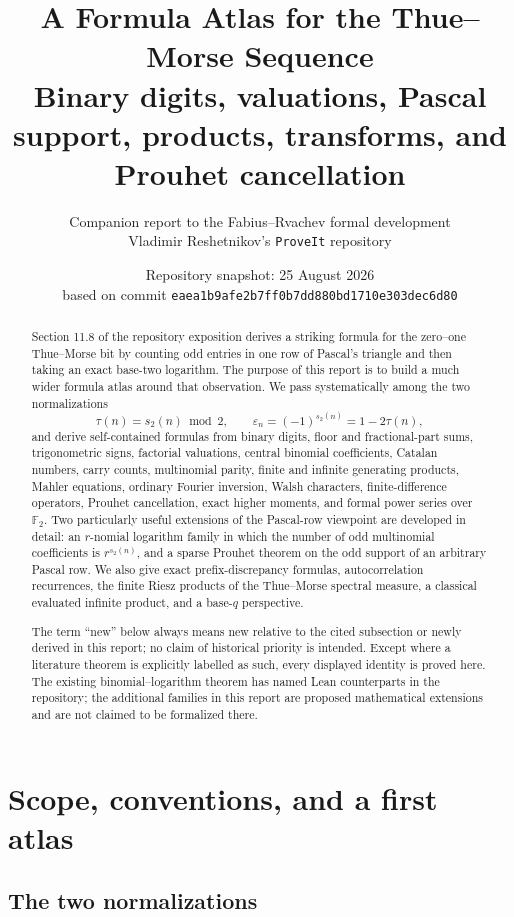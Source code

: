 \documentclass[11pt,oneside]{article}
\title{\bfseries A Formula Atlas for the Thue--Morse Sequence\\[0.35em]
\large Binary digits, valuations, Pascal support, products, transforms, and Prouhet cancellation}
\author{Companion report to the Fabius--Rvachev formal development\\
\small Vladimir Reshetnikov's \texttt{ProveIt} repository}
\date{Repository snapshot: 25 August 2026\\
\small based on commit \nolinkurl{eaea1b9afe2b7ff0b7dd880bd1710e303dec6d80}}
\theoremstyle{definition}
\theoremstyle{remark}
\newcommand{\F}{\mathbb F}
\newcommand{\swt}{s_2}
\newcommand{\eps}{\varepsilon}
\newcommand{\1}{\mathbf 1}
\begin{document}
\maketitle

\begin{abstract}
Section 11.8 of the repository exposition derives a striking formula for the zero--one
Thue--Morse bit by counting odd entries in one row of Pascal's triangle and then taking an
exact base-two logarithm.  The purpose of this report is to build a much wider formula atlas
around that observation.  We pass systematically among the two normalizations
\[
  \tau(n)=\swt(n)\bmod 2,\qquad
  \eps_n=(-1)^{\swt(n)}=1-2\tau(n),
\]
and derive self-contained formulas from binary digits, floor and fractional-part sums,
trigonometric signs, factorial valuations, central binomial coefficients, Catalan numbers,
carry counts, multinomial parity, finite and infinite generating products, Mahler equations,
ordinary Fourier inversion, Walsh characters, finite-difference operators, Prouhet
cancellation, exact higher moments, and formal power series over \(\F_2\).  Two particularly
useful extensions of the Pascal-row viewpoint are developed in detail: an \(r\)-nomial
logarithm family in which the number of odd multinomial coefficients is
\(r^{\swt(n)}\), and a sparse Prouhet theorem on the odd support of an arbitrary Pascal row.
We also give exact prefix-discrepancy formulas, autocorrelation recurrences, the finite Riesz
products of the Thue--Morse spectral measure, a classical evaluated infinite product, and a
base-\(q\) perspective.

The term ``new'' below always means new relative to the cited subsection or newly derived in
this report; no claim of historical priority is intended.  Except where a literature theorem
is explicitly labelled as such, every displayed identity is proved here.  The existing
binomial--logarithm theorem has named Lean counterparts in the repository; the additional
families in this report are proposed mathematical extensions and are not claimed to be
formalized there.
\end{abstract}

\tableofcontents
\newpage

\section{Scope, conventions, and a first atlas}
\label{sec:scope}

\subsection{The two normalizations}
\end{document}
